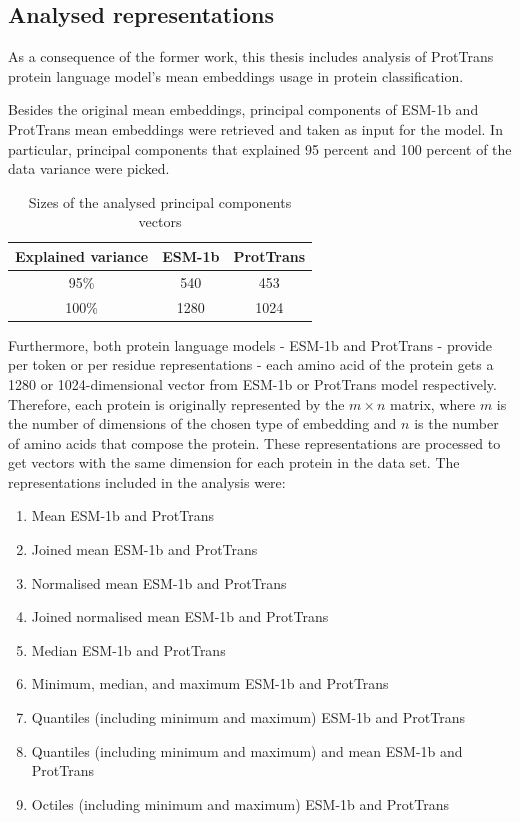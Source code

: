 \documentclass[12pt]{article}
\begin{document}
	\newpage

	\subsection{Analysed representations}
	\label{analysedRepresentations}

	As a consequence of the former work, this thesis includes 
	analysis of ProtTrans protein language model's mean embeddings 
	usage in protein classification. 

	Besides the original mean embeddings, principal components 
	of ESM-1b and ProtTrans
	mean embeddings were retrieved and taken as input for the 
	model. In particular, principal components that explained 
	95 percent and 100 percent of the data variance were picked.

	\begin{table}[h!]
		\caption{Sizes of the analysed principal components 
		vectors}
		\vspace{0.2cm}
		\centering
		\begin{tabular}{ | c | c c | }
			\hline 
			Explained variance & ESM-1b & ProtTrans \\
			\hline 
			95\% & 540 & 453 \\
			100\% & 1280 & 1024 \\
			\hline    
		\end{tabular}
		\label{table:vectorsPCADimensions}
	\end{table}
	
	Furthermore, both protein language models - ESM-1b and 
	ProtTrans - provide 
	per token or per residue representations - each 
	amino acid of the protein gets a 1280 or 1024-dimensional vector from
	ESM-1b or ProtTrans model respectively. Therefore, each protein is 
	originally represented by the ${m \times n}$ matrix, 
	where ${m}$ is the number of dimensions of the chosen type of embedding
	and ${n}$ is the number of amino acids that compose the protein. 
	These representations are processed to get vectors with the same 
	dimension 
	for each protein in the data set. The representations 
	included in the analysis were:

	\begin{enumerate}
		\item Mean ESM-1b and ProtTrans 
		\item Joined mean ESM-1b and ProtTrans
		\item Normalised mean ESM-1b and ProtTrans
		\item Joined normalised mean ESM-1b and ProtTrans
		\item Median ESM-1b and ProtTrans
		\item Minimum, median, and maximum ESM-1b and ProtTrans
		\item Quantiles (including minimum and maximum) ESM-1b and ProtTrans
		\item Quantiles (including minimum and maximum) and mean ESM-1b and ProtTrans
		\item Octiles (including minimum and maximum) ESM-1b and ProtTrans
	\end{enumerate}
\end{document}
